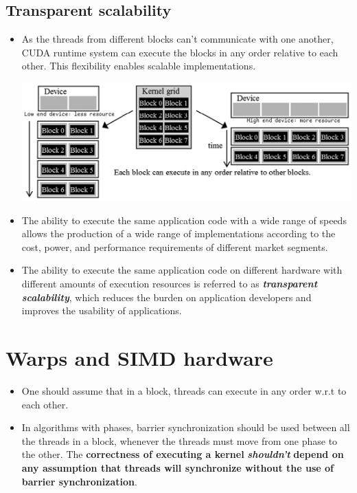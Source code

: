 \subsection{Transparent scalability}
\begin{itemize}

    \item As the threads from different blocks can't communicate with one another, CUDA runtime system can execute the blocks in any order relative to each other. This flexibility enables scalable implementations.
          \begin{center}
              \includegraphics[width=0.9\linewidth]{Images/CompArch/Scaling.png}
          \end{center}
    \item The ability to execute the same application code with a wide range of speeds allows the production of a wide range of implementations according to the cost, power, and performance requirements of different market segments.
    \item The ability to execute the same application code on different hardware with different amounts of execution resources is referred to as \textbf{\textit{transparent scalability}}, which reduces the burden on application developers and improves the usability of applications.

\end{itemize}

\section{Warps and SIMD hardware}
\begin{itemize}
    \item One should assume that in a block, threads can execute in any order w.r.t to each other.
    \item In algorithms with phases, barrier synchronization should be used between all the threads in a block, whenever the threads must move from one phase to the other. The \textbf{correctness of executing a kernel} \textbf{\textit{shouldn't}} \textbf{depend on any assumption that threads will synchronize without the use of barrier synchronization}.
\end{itemize}

